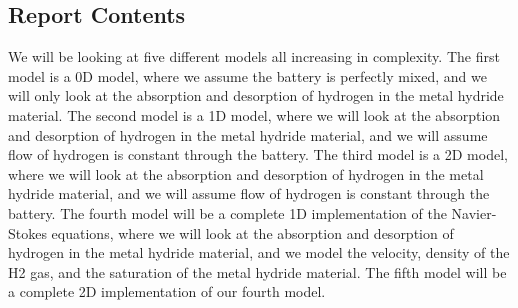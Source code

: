 
\subsection{Report Contents}

We will be looking at five different models all increasing in complexity. The first model is a 0D model, where we assume the battery is perfectly mixed, and we will only look at the absorption and desorption of hydrogen in the metal hydride material. The second model is a 1D model, where we will look at the absorption and desorption of hydrogen in the metal hydride material, and we will assume flow of hydrogen is constant through the battery. The third model is a 2D model, where we will look at the absorption and desorption of hydrogen in the metal hydride material, and we will assume flow of hydrogen is constant through the battery. The fourth model will be a complete 1D implementation of the Navier-Stokes equations, where we will look at the absorption and desorption of hydrogen in the metal hydride material, and we model the velocity, density of the H2 gas, and the saturation of the metal hydride material. The fifth model will be a complete 2D implementation of our fourth model.

